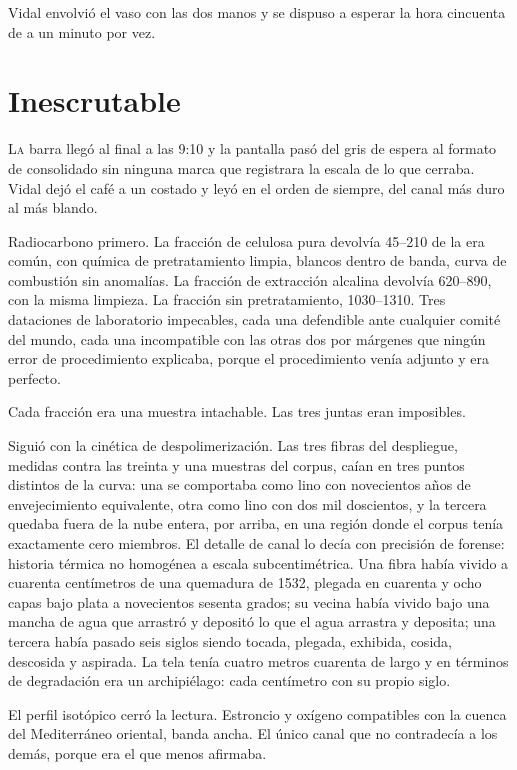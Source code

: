 Vidal envolvió el vaso con las dos manos y se dispuso a esperar la hora cincuenta de a un minuto por vez.

\clearpage

\chapter{Inescrutable}

\lettrine[lines=2, lhang=0.1, nindent=0.2em]{L}{a} barra llegó al final a las 9:10 y la pantalla pasó del gris de espera al formato de consolidado sin ninguna marca que registrara la escala de lo que cerraba. Vidal dejó el café a un costado y leyó en el orden de siempre, del canal más duro al más blando.


Radiocarbono primero. La fracción de celulosa pura devolvía 45--210 de la era común, con química de pretratamiento limpia, blancos dentro de banda, curva de combustión sin anomalías. La fracción de extracción alcalina devolvía 620--890, con la misma limpieza. La fracción sin pretratamiento, 1030--1310. Tres dataciones de laboratorio impecables, cada una defendible ante cualquier comité del mundo, cada una incompatible con las otras dos por márgenes que ningún error de procedimiento explicaba, porque el procedimiento venía adjunto y era perfecto.

Cada fracción era una muestra intachable. Las tres juntas eran imposibles.

Siguió con la cinética de despolimerización. Las tres fibras del despliegue, medidas contra las treinta y una muestras del corpus, caían en tres puntos distintos de la curva: una se comportaba como lino con novecientos años de envejecimiento equivalente, otra como lino con dos mil doscientos, y la tercera quedaba fuera de la nube entera, por arriba, en una región donde el corpus tenía exactamente cero miembros. El detalle de canal lo decía con precisión de forense: historia térmica no homogénea a escala subcentimétrica. Una fibra había vivido a cuarenta centímetros de una quemadura de 1532, plegada en cuarenta y ocho capas bajo plata a novecientos sesenta grados; su vecina había vivido bajo una mancha de agua que arrastró y depositó lo que el agua arrastra y deposita; una tercera había pasado seis siglos siendo tocada, plegada, exhibida, cosida, descosida y aspirada. La tela tenía cuatro metros cuarenta de largo y en términos de degradación era un archipiélago: cada centímetro con su propio siglo.

El perfil isotópico cerró la lectura. Estroncio y oxígeno compatibles con la cuenca del Mediterráneo oriental, banda ancha. El único canal que no contradecía a los demás, porque era el que menos afirmaba.


